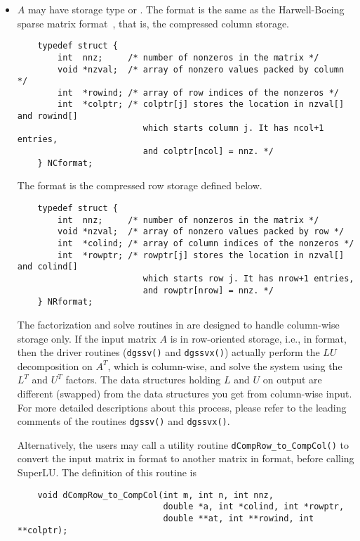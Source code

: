 \begin{itemize}
\item
$A$ may have storage type {\NC} or {\NR}.
The {\NC} format is the same as the Harwell-Boeing sparse 
matrix format~\cite{duffgrimes92}, that is, the compressed column storage.
\begin{verbatim}
    typedef struct {
        int  nnz;     /* number of nonzeros in the matrix */
        void *nzval;  /* array of nonzero values packed by column */
        int  *rowind; /* array of row indices of the nonzeros */
        int  *colptr; /* colptr[j] stores the location in nzval[] and rowind[]
                         which starts column j. It has ncol+1 entries, 
                         and colptr[ncol] = nnz. */
    } NCformat;
\end{verbatim}

The {\NR} format is the compressed row storage defined below.
\begin{verbatim}
    typedef struct {
        int  nnz;     /* number of nonzeros in the matrix */
        void *nzval;  /* array of nonzero values packed by row */
        int  *colind; /* array of column indices of the nonzeros */
        int  *rowptr; /* rowptr[j] stores the location in nzval[] and colind[]
                         which starts row j. It has nrow+1 entries,
                         and rowptr[nrow] = nnz. */
    } NRformat;
\end{verbatim}

The factorization and solve routines in {\superlu} are designed to
handle column-wise storage only. If the input matrix $A$ is in row-oriented
storage, i.e., in {\NR} format, then the driver routines ({\tt dgssv()} and
{\tt dgssvx()}) actually perform the $LU$ decomposition on $A^T$, which
is column-wise, and solve the system using the $L^T$ and $U^T$ factors.
The data structures holding $L$ and $U$ on output are different (swapped)
from the data structures you get from column-wise input. For more detailed
descriptions about this process, please refer to the leading comments 
of the routines {\tt dgssv()} and {\tt dgssvx()}.

Alternatively, the users may call a utility routine
{\tt dCompRow\_to\_CompCol()}
to convert the input matrix in {\NR} format to another matrix
in {\NC} format, before calling SuperLU. The definition of this routine is
\begin{verbatim}
    void dCompRow_to_CompCol(int m, int n, int nnz,
                             double *a, int *colind, int *rowptr,
                             double **at, int **rowind, int **colptr);
\end{verbatim}


\end{itemize}
